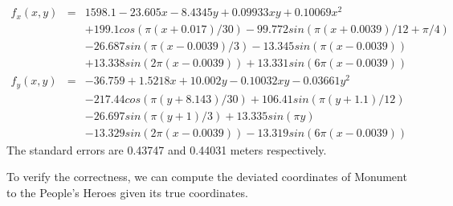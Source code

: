 \documentclass[a4paper]{article}
\begin{document}
\begin{eqnarray}
f_x(x,y) &=& 1598.1-23.605x -8.4345y +0.09933xy +0.10069x^2 \nonumber \\
          & & +199.1cos(\pi(x+0.017)/30) -99.772sin(\pi(x+0.0039)/12+\pi/4) \nonumber \\
          & & -26.687sin(\pi(x-0.0039)/3) -13.345sin(\pi(x-0.0039)) \nonumber \\
          & & +13.338sin(2\pi(x-0.0039)) +13.331sin(6\pi(x-0.0039)) \\
f_y(x,y) &=& -36.759 +1.5218x +10.002y -0.10032xy -0.03661y^2 \nonumber \\
         & & -217.44cos(\pi(y+8.143)/30)+106.41sin(\pi(y+1.1)/12) \nonumber \\
         & & -26.697sin(\pi(y+1)/3) +13.335sin(\pi y) \nonumber \\
         & & -13.329sin(2\pi(x-0.0039)) -13.319sin(6\pi(x-0.0039))
\end{eqnarray}
The standard errors are 0.43747 and 0.44031 meters respectively.

To verify the correctness, we can compute the deviated coordinates of Monument
to the People's Heroes given its true coordinates.
\end{document}
